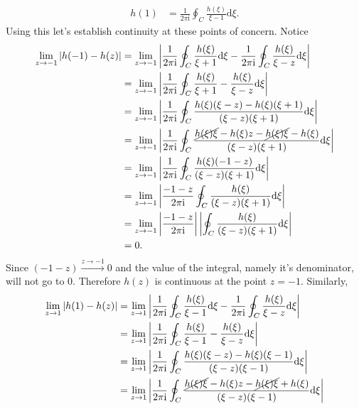 \documentclass[10pt]{amsart}
\newcommand{\D}{\mathrm{d}}
\newcommand{\I}{\mathrm{i}}
\theoremstyle{nonumberplain}
\begin{document}
\begin{enumerate}[label={\bf {\arabic*}:}]
\begin{itemize}
\begin{align*}
h(1) &= \frac 1 {2\pi \I}\oint_C \frac {h(\xi)}{\xi - 1} \D \xi.
\end{align*}
Using this let's establish continuity at these points of concern.
Notice
\begin{align*}
\lim_{z \rightarrow -1} \left| h(-1) - h(z) \right|
	&= \lim_{z \rightarrow -1} \left| \frac 1 {2\pi \I} \oint_C \frac {h(\xi)}{\xi + 1} \D \xi - \frac 1 {2\pi \I}\oint_C \frac {h(\xi)}{\xi - z} \D \xi \right| \\
	&= \lim_{z \rightarrow -1} \left| \frac 1 {2\pi \I} \oint_C \frac {h(\xi)}{\xi + 1} -  \frac {h(\xi)}{\xi - z} \D \xi \right| \\
	&= \lim_{z \rightarrow -1} \left| \frac 1 {2\pi \I} \oint_C \frac {h(\xi)(\xi - z) - h(\xi)(\xi + 1)}{(\xi - z)(\xi + 1)} \D \xi \right| \\
	&= \lim_{z \rightarrow -1} \left| \frac 1 {2\pi \I} \oint_C \frac {\cancel{h(\xi)\xi} - h(\xi)z - \cancel{h(\xi)\xi} - h(\xi)}{(\xi - z)(\xi + 1)} \D \xi \right| \\
	&= \lim_{z \rightarrow -1} \left| \frac 1 {2\pi \I} \oint_C \frac {h(\xi)(- 1 - z)}{(\xi - z)(\xi + 1)} \D \xi \right| \\
	&= \lim_{z \rightarrow -1} \left| \frac {-1 - z} {2\pi \I} \oint_C \frac {h(\xi)}{(\xi - z)(\xi + 1)} \D \xi \right| \\
	&= \lim_{z \rightarrow -1} \left| \frac {-1 - z} {2\pi \I} \right| \left|\oint_C \frac {h(\xi)}{(\xi - z)(\xi + 1)} \D \xi \right| \\
	&= 0.
\end{align*}
Since $(-1-z)\overset{z \to -1}{\longrightarrow} 0$ and the value of the integral, namely it's denominator, will not go to 0.
Therefore $h(z)$ is continuous at the point $z = -1$.
Similarly,
\begin{align*}
\lim_{z \rightarrow 1} \left| h(1) - h(z) \right|
	&= \lim_{z \rightarrow 1} \left| \frac 1 {2\pi \I} \oint_C \frac {h(\xi)}{\xi - 1} \D \xi - \frac 1 {2\pi \I}\oint_C \frac {h(\xi)}{\xi - z} \D \xi \right| \\
	&= \lim_{z \rightarrow 1} \left| \frac 1 {2\pi \I} \oint_C \frac {h(\xi)}{\xi - 1} -  \frac {h(\xi)}{\xi - z} \D \xi \right| \\
	&= \lim_{z \rightarrow 1} \left| \frac 1 {2\pi \I} \oint_C \frac {h(\xi)(\xi - z) - h(\xi)(\xi - 1)}{(\xi - z)(\xi - 1)} \D \xi \right| \\
	&= \lim_{z \rightarrow 1} \left| \frac 1 {2\pi \I} \oint_C \frac {\cancel{h(\xi)\xi} - h(\xi)z - \cancel{h(\xi)\xi} + h(\xi)}{(\xi - z)(\xi - 1)} \D \xi \right| \\

\end{align*}
\end{itemize}
\end{enumerate}
\end{document}
